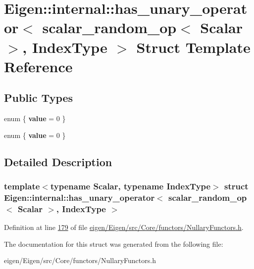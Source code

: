 \hypertarget{struct_eigen_1_1internal_1_1has__unary__operator_3_01scalar__random__op_3_01_scalar_01_4_00_01_index_type_01_4}{}\section{Eigen\+:\+:internal\+:\+:has\+\_\+unary\+\_\+operator$<$ scalar\+\_\+random\+\_\+op$<$ Scalar $>$, Index\+Type $>$ Struct Template Reference}
\label{struct_eigen_1_1internal_1_1has__unary__operator_3_01scalar__random__op_3_01_scalar_01_4_00_01_index_type_01_4}
\subsection*{Public Types}
\begin{DoxyCompactItemize}
\item 
\mbox{\label{struct_eigen_1_1internal_1_1has__unary__operator_3_01scalar__random__op_3_01_scalar_01_4_00_01_index_type_01_4_a6c5445d8f270a01e0631409ff6fcc687}} 
enum \{ {\bfseries value} = 0
 \}
\item 
\mbox{\label{struct_eigen_1_1internal_1_1has__unary__operator_3_01scalar__random__op_3_01_scalar_01_4_00_01_index_type_01_4_a38bfecfe1be90945e859c6705bec48a4}} 
enum \{ {\bfseries value} = 0
 \}
\end{DoxyCompactItemize}


\subsection{Detailed Description}
\subsubsection*{template$<$typename Scalar, typename Index\+Type$>$\newline
struct Eigen\+::internal\+::has\+\_\+unary\+\_\+operator$<$ scalar\+\_\+random\+\_\+op$<$ Scalar $>$, Index\+Type $>$}



Definition at line \hyperlink{eigen_2_eigen_2src_2_core_2functors_2_nullary_functors_8h_source_l00179}{179} of file \hyperlink{eigen_2_eigen_2src_2_core_2functors_2_nullary_functors_8h_source}{eigen/\+Eigen/src/\+Core/functors/\+Nullary\+Functors.\+h}.



The documentation for this struct was generated from the following file\+:\begin{DoxyCompactItemize}
\item 
eigen/\+Eigen/src/\+Core/functors/\+Nullary\+Functors.\+h\end{DoxyCompactItemize}
